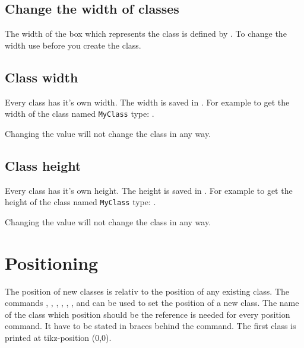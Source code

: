 \documentclass[parskip=full]{scrartcl}
\begin{document}
	\subsection{Change the width of classes}
	The width of the box which represents the class is defined by . To change the width use  before you create the class.
	
	\subsection{Class width}
	Every class has it's own width. The width is saved in . For example to get the width of the class named \texttt{MyClass} type: .\vspace{\baselineskip}
	
	\begin{attention}
		Changing the  value will not change the class in any way.
	\end{attention}

	\subsection{Class height}
	Every class has it's own height. The height is saved in . For example to get the height of the class named \texttt{MyClass} type: .\vspace{\baselineskip}
	
	\begin{attention}
		Changing the  value will not change the class in any way.
	\end{attention}

	\section{Positioning}
	The position of new classes is relativ to the position of any existing class. The commands , , , , , ,  and  can be used to set the position of a new class. The name of the class which position should be the reference is needed for every position command. It have to be stated in braces behind the command. The first class is printed at tikz-position (0,0).
		
\end{document}
